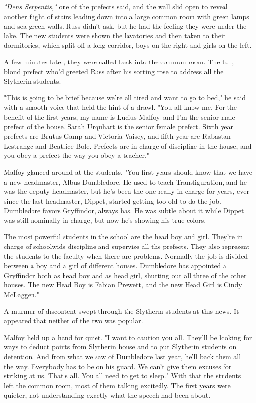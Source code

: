 \emph{"Dens Serpentis,"} one of the prefects said, and the wall slid open to reveal another flight of stairs leading down into a large common room with green lamps and sea-green walls. Russ didn't ask, but he had the feeling they were under the lake. The new students were shown the lavatories and then taken to their dormitories, which split off a long corridor, boys on the right and girls on the left.

A few minutes later, they were called back into the common room. The tall, blond prefect who'd greeted Russ after his sorting rose to address all the Slytherin students.

"This is going to be brief because we're all tired and want to go to bed," he said with a smooth voice that held the hint of a drawl. "You all know me. For the benefit of the first years, my name is Lucius Malfoy, and I'm the senior male prefect of the house. Sarah Urquhart is the senior female prefect. Sixth year prefects are Brutus Gamp and Victoria Vaisey, and fifth year are Rabastan Lestrange and Beatrice Bole. Prefects are in charge of discipline in the house, and you obey a prefect the way you obey a teacher."

Malfoy glanced around at the students. "You first years should know that we have a new headmaster, Albus Dumbledore. He used to teach Transfiguration, and he was the deputy headmaster, but he's been the one really in charge for years, ever since the last headmaster, Dippet, started getting too old to do the job. Dumbledore favors Gryffindor, always has. He was subtle about it while Dippet was still nominally in charge, but now he's showing his true colors.

\textooquote The most powerful students in the school are the head boy and girl. They're in charge of schoolwide discipline and supervise all the prefects. They also represent the students to the faculty when there are problems. Normally the job is divided between a boy and a girl of different houses. Dumbledore has appointed a Gryffindor both as head boy and as head girl, shutting out all three of the other houses. The new Head Boy is Fabian Prewett, and the new Head Girl is Cindy McLaggen."

A murmur of discontent swept through the Slytherin students at this news. It appeared that neither of the two was popular.

Malfoy held up a hand for quiet. "I want to caution you all. They'll be looking for ways to deduct points from Slytherin house and to put Slytherin students on detention. And from what we saw of Dumbledore last year, he'll back them all the way. Everybody has to be on his guard. We can't give them excuses for striking at us. That's all. You all need to get to sleep." With that the students left the common room, most of them talking excitedly. The first years were quieter, not understanding exactly what the speech had been about.

